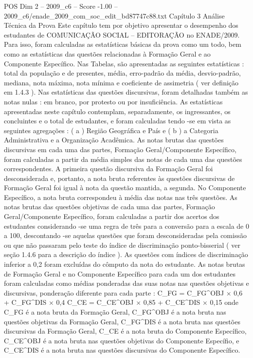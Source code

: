 \begin{textsample}{POS Dim 2 – 2009\_c6 – Score -1.00 – 2009\_c6/enade\_2009\_com\_soc\_edit\_bd87747c88.txt}  \label{ex:f2_pos_301}
Capítulo 3 Análise Técnica da Prova Este capítulo tem por objetivo apresentar o desempenho dos estudantes de COMUNICAÇÃO SOCIAL – EDITORAÇÃO no ENADE/2009.
Para isso, foram calculadas as estatísticas básicas da prova como um todo, bem como as estatísticas das questões relacionadas à Formação Geral e ao Componente Específico.
Nas Tabelas, são apresentadas as seguintes estatísticas : total da população e de presentes, média, erro-padrão da média, desvio-padrão, mediana, nota máxima, nota mínima e coeficiente de assimetria ( ver definição em 1.4.3 ).
Nas estatísticas das questões discursivas, foram detalhadas também as notas nulas : em branco, por protesto ou por insuficiência.
As estatísticas apresentadas neste capítulo contemplam, separadamente, os ingressantes, os concluintes e o total de estudantes, e foram calculadas tendo -se em vista as seguintes agregações : ( a ) Região Geográfica e País e ( b ) a Categoria Administrativa e a Organização Acadêmica.
As notas brutas das questões discursivas em cada uma das partes, Formação Geral/Componente Específico, foram calculadas a partir da média simples das notas de cada uma das questões correspondentes.
A primeira questão discursiva da Formação Geral foi desconsiderada e, portanto, a nota bruta referentes às questões discursivas de Formação Geral foi igual à nota da questão mantida, a segunda.
No Componente Específico, a nota bruta correspondeu à média das notas nas três questões.
As notas brutas das questões objetivas de cada uma das partes, Formação Geral/Componente Específico, foram calculadas a partir dos acertos dos estudantes considerando -se uma regra de três para a conversão para a escala de 0 a 100, descontando -se aquelas questões que foram desconsideradas pela comissão ou que não passaram pelo teste do índice de discriminação ponto-bisserial ( ver seção 1.4.6 para a descrição do índice ).
As questões com índices de discriminação inferior a 0,2 foram excluídas do cômputo da nota do estudante.
As notas brutas de Formação Geral e no Componente Específico para cada um dos estudantes foram calculadas como médias ponderadas das suas notas nas questões objetivas e discursivas, ponderação diferente para cada parte : C\_FG = C\_FG\textasciicircum{}OBJ × 0,6 + C\_FG\textasciicircum{}DIS × 0,4 C\_CE = C\_CE\textasciicircum{}OBJ × 0,85 + C\_CE\textasciicircum{}DIS × 0,15 onde C\_FG é a nota bruta da Formação Geral, C\_FG\textasciicircum{}OBJ é a nota bruta nas questões objetivas da Formação Geral, C\_FG\textasciicircum{}DIS é a nota bruta nas questões discursivas da Formação Geral, C\_CE é a nota bruta do Componente Específico, C\_CE\textasciicircum{}OBJ é a nota bruta nas questões objetivas do Componente Específio, e C\_CE\textasciicircum{}DIS é a nota bruta nas questões discursivas do Componente Específico.

\end{textsample}
